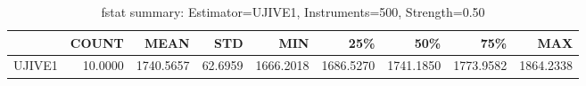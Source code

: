 \begin{table}[ht]
\centering
\caption{fstat summary: Estimator=UJIVE1, Instruments=500, Strength=0.50}
\begin{tabular}{lrrrrrrrr}
\toprule
 & COUNT & MEAN & STD & MIN & 25\% & 50\% & 75\% & MAX \\
\midrule
UJIVE1 & 10.0000 & 1740.5657 & 62.6959 & 1666.2018 & 1686.5270 & 1741.1850 & 1773.9582 & 1864.2338 \\
\bottomrule
\end{tabular}
\end{table}
